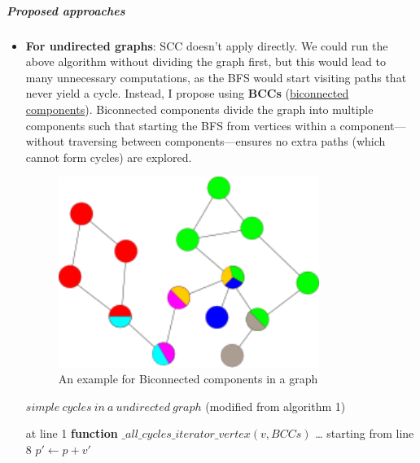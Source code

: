 \subparagraph{Proposed approaches}
\begin{itemize}
    \item \textbf{For undirected graphs}: SCC doesn’t apply directly.
          We could run the above algorithm without dividing the graph first,
          but this would lead to many unnecessary computations,
          as the BFS would start visiting paths that never yield a cycle.
          Instead, I propose using \textbf{BCCs} (\href{https://en.wikipedia.org/wiki/Biconnected_component}{biconnected components}).
          Biconnected components divide the graph into multiple components
          such that starting the BFS from vertices
          within a component—without traversing between components—ensures
          no extra paths (which cannot form cycles) are explored.
          \begin{figure}[htbp]
              \centering
              \includegraphics[width=0.8\textwidth]{Project/Details/Graph-Biconnected-Components.png} %
              \caption{An example for Biconnected components in a graph}
              \label{fig:example}
          \end{figure}
          \begin{algorithm}[H]
              \caption{$simple\ cycles\ in\ a\ undirected\ graph$ (modified from algorithm 1)}
              \begin{algorithmic}
                  \State at line 1
                  \State \textbf{function} $\_all\_cycles\_iterator\_vertex(v, BCCs)$
                  \State \ldots
                  \State starting from line 8
                  \State $p' \gets p + v'$

\end{algorithmic}
\end{algorithm}
\end{itemize}
